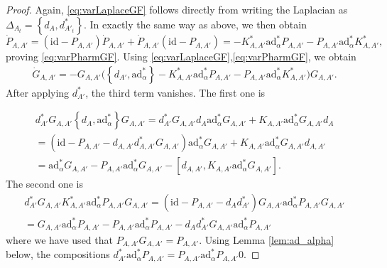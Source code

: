 \documentclass[11pt,a4paper]{amsart}
\theoremstyle{plain} %
\theoremstyle{definition}
\theoremstyle{remark}
\newcommand{\dd}{d}
\newcommand{\mr}{\mathrm}
\begin{document}
\begin{proof}
Again, \eqref{eq:varLaplaceGF} follows directly from writing the Laplacian as $\Delta_{A_t} =\left\lbrace \dd_A,\dd^*_{A'_t}\right\rbrace$. In exactly the same way as above, we then obtain 
$$\dot{P}_{A,A'} = (\mr{id} - P_{A,A'})\dot{P}_{A,A'} + \dot{P}_{A,A'}(\mr{id}-P_{A,A'}) =  - K^*_{A,A'} \mathrm{ad}^*_\alpha   P_{A,A'} - P_{A,A'}  \mathrm{ad}^*_\alpha   K^*_{A,A'}, $$ proving \eqref{eq:varPharmGF}. Using \eqref{eq:varLaplaceGF},\eqref{eq:varPharmGF}, we obtain
\begin{multline}\label{variation of G wrt A prime}
\dot{G}_{A,A'} =  -G_{A,A'}\big( \left\lbrace \dd_{A'},\mathrm{ad}^*_\alpha\right\rbrace  
- K^*_{A,A'} \mathrm{ad}^*_\alpha  P_{A,A'} - P_{A ,A'}  \mathrm{ad}^*_\alpha    K^*_{A,A'} \big)G_{A,A'}.
\end{multline} 
After applying $\dd^*_{A'}$, the third term vanishes. The first one is

\begin{multline*}
\dd^*_{A'}G_{A,A'}\left\lbrace \dd_{A},\mathrm{ad}^*_\alpha \right\rbrace G_{A,A'} = \dd^*_{A'}G_{A,A'}\dd_{A}\mathrm{ad}^*_\alpha G_{A,A'} + K_{A,A'}\mathrm{ad}^*_\alpha G_{A,A'} \dd_{A} \\
= (\mathrm{id} - P_{A,A'} - \dd_{A,A'}\dd^*_{A,A'}G_{A,A'})\mathrm{ad}^*_\alpha  G_{A,A'} + K_{A,A'}\mathrm{ad}^*_\alpha G_{A,A'}\dd_{A,A'}  \\ 
= \mathrm{ad}^*_\alpha G_{A,A'} - P_{A,A'}\mathrm{ad}^*_\alpha G_{A,A'} - \left[\dd_{A,A'},K_{A,A'}\mathrm{ad}^*_\alpha G_{A,A'}\right].
\end{multline*}
The second one is
\begin{multline*}    \dd_{A'}^*G_{A,A'} K^*_{A,A'} \mathrm{ad}^*_\alpha   P_{A,A'} G_{A,A'} = (\mathrm{id} - P_{A,A'} - \dd_{A}\dd_{A'}^*) G_{A,A'}\mathrm{ad}^*_\alpha P_{A,A'}G_{A,A'} 
    \\ = G_{A,A'}\mr{ad}^*_\alpha P_{A,A'} - P_{A,A'} \mr{ad}^*_\alpha P_{A,A'} - \dd_{A}\dd^*_{A'}G_{A,A'}\mr{ad}^*_\alpha P_{A,A'}
\end{multline*} 
where we have used that $P_{A,A'}G_{A,A'} = P_{A,A'}$. 
Using Lemma \ref{lem:ad_alpha} below, the compositions $\dd^*_{A'}\mathrm{ad}^*_\alpha P_{A,A'} =  P_{A,A'}\mathrm{ad}^*_\alpha P_{A,A'} 0$.


\end{proof}
\end{document}
